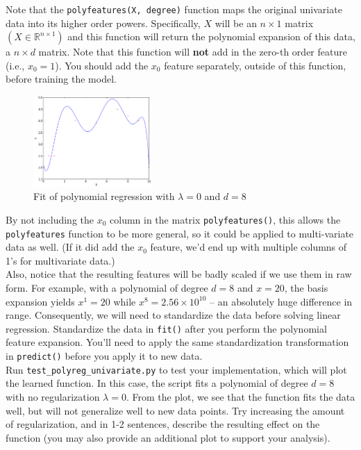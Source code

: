 \documentclass{article}
\begin{document}
\begin{aprob}
    Note that the \texttt{polyfeatures(X, degree)} function maps the original univariate data into its higher order powers.  Specifically, $X$ will be an $n \times 1$ matrix $(X \in \mathbb{R}^{n \times 1})$ and this function will return the polynomial expansion of this data, a $n \times d$ matrix.  Note that this function will {\bf not} add in the zero-th order feature (i.e., $x_0 = 1$).  You should add the $x_0$ feature separately, outside of this function, before training the model.

    \begin{figure}
        \centering
        \vspace{-1em}
        \includegraphics[width=0.4\textwidth]{../img/polyregDegree8.png}
        \vspace{-1em}
        \caption{Fit of polynomial regression with $\lambda = 0$ and $d = 8$}\label{fig:polyregUnivariate}
        \vspace{-2em}
    \end{figure}

    By not including the $x_0$ column in the matrix \texttt{polyfeatures()}, this allows the \texttt{polyfeatures} function to be more general, so it could be applied to multi-variate data as well. (If it did add the $x_0$ feature, we'd end up with multiple columns of 1's for multivariate data.)\\
    
    Also, notice that the resulting features will be badly scaled if we use them in raw form.  For example, with a polynomial of degree $d = 8$ and $x = 20$, the basis expansion yields $x^1 = 20$ while $x^8 = 2.56 \times 10^{10}$ -- an
    absolutely huge difference in range.  Consequently, we will need to standardize the data before solving linear regression.  Standardize the data in \texttt{fit()} after you perform the polynomial feature expansion.  You'll need to apply the same standardization transformation in \texttt{predict()} before you apply it to new data.\\
    
    Run \texttt{test\_polyreg\_univariate.py} to test your implementation, which will plot the learned function.  In this case, the script fits a polynomial of degree $d=8$ with no regularization $\lambda = 0$.  From the plot, we see that the function fits the data well, but will not generalize well to new data points.  Try increasing the amount of regularization, and in 1-2 sentences, describe the resulting effect on the function (you may also provide an additional plot to support your analysis).
\end{aprob}
\end{document}
